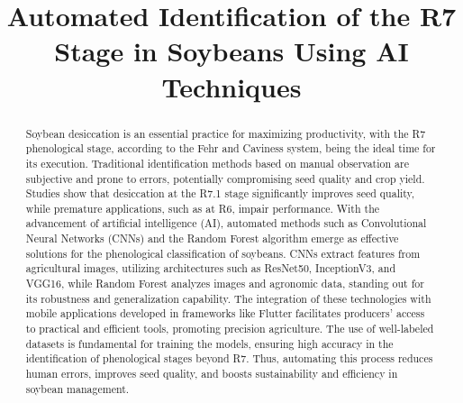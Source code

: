 \documentclass[10pt,conference]{IEEEtran}
\begin{document}
\title{Automated Identification of the R7 Stage in Soybeans Using AI Techniques}
\newif\iffinal
\finaltrue
\iffinal
\else
  \author{ID do artigo Latin.science 2020: \cmtid \\ }
\fi
\maketitle
\thispagestyle{fancy}
\begin{abstract}Soybean desiccation is an essential practice for maximizing productivity, with the R7 phenological stage, according to the Fehr and Caviness system, being the ideal time for its execution. \cite{fehr1977stages} Traditional identification methods based on manual observation are subjective and prone to errors, potentially compromising seed quality and crop yield. Studies show that desiccation at the R7.1 stage significantly improves seed quality, while premature applications, such as at R6, impair performance. With the advancement of artificial intelligence (AI), automated methods such as Convolutional Neural Networks (CNNs) and the Random Forest algorithm emerge as effective solutions for the phenological classification of soybeans. CNNs extract features from agricultural images, utilizing architectures such as ResNet50, InceptionV3, and VGG16, while Random Forest analyzes images and agronomic data, standing out for its robustness and generalization capability. The integration of these technologies with mobile applications developed in frameworks like Flutter facilitates producers' access to practical and efficient tools, promoting precision agriculture. The use of well-labeled datasets is fundamental for training the models, ensuring high accuracy in the identification of phenological stages beyond R7. Thus, automating this process reduces human errors, improves seed quality, and boosts sustainability and efficiency in soybean management. \end{abstract}
\end{document}
